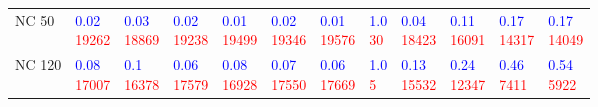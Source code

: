 \begin{tabular}{llllllllllll}
NC 50  &  \makecell{\textcolor{blue}{0.02} \\ \textcolor{red}{19262}} &  \makecell{\textcolor{blue}{0.03} \\ \textcolor{red}{18869}} &  \makecell{\textcolor{blue}{0.02} \\ \textcolor{red}{19238}} &  \makecell{\textcolor{blue}{0.01} \\ \textcolor{red}{19499}} &  \makecell{\textcolor{blue}{0.02} \\ \textcolor{red}{19346}} &  \makecell{\textcolor{blue}{0.01} \\ \textcolor{red}{19576}} &    \makecell{\textcolor{blue}{1.0} \\ \textcolor{red}{30}} &  \makecell{\textcolor{blue}{0.04} \\ \textcolor{red}{18423}} &  \makecell{\textcolor{blue}{0.11} \\ \textcolor{red}{16091}} &  \makecell{\textcolor{blue}{0.17} \\ \textcolor{red}{14317}} &  \makecell{\textcolor{blue}{0.17} \\ \textcolor{red}{14049}} \\
NC 120 &  \makecell{\textcolor{blue}{0.08} \\ \textcolor{red}{17007}} &   \makecell{\textcolor{blue}{0.1} \\ \textcolor{red}{16378}} &  \makecell{\textcolor{blue}{0.06} \\ \textcolor{red}{17579}} &  \makecell{\textcolor{blue}{0.08} \\ \textcolor{red}{16928}} &  \makecell{\textcolor{blue}{0.07} \\ \textcolor{red}{17550}} &  \makecell{\textcolor{blue}{0.06} \\ \textcolor{red}{17669}} &     \makecell{\textcolor{blue}{1.0} \\ \textcolor{red}{5}} &  \makecell{\textcolor{blue}{0.13} \\ \textcolor{red}{15532}} &  \makecell{\textcolor{blue}{0.24} \\ \textcolor{red}{12347}} &   \makecell{\textcolor{blue}{0.46} \\ \textcolor{red}{7411}} &   \makecell{\textcolor{blue}{0.54} \\ \textcolor{red}{5922}} \\

\end{tabular}
